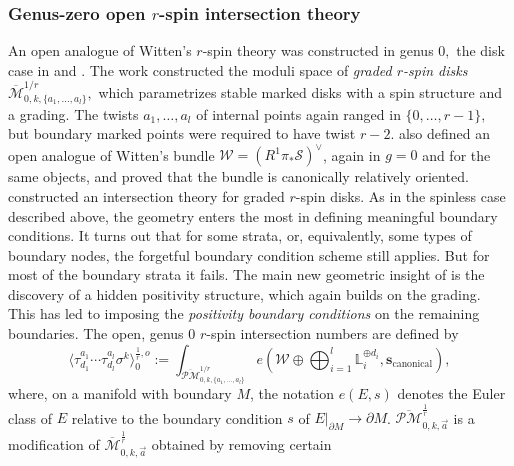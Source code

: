\documentclass[11pt]{amsart}
\theoremstyle{definition}
\theoremstyle{remark}
\newcommand{\Mbarr}{{{\overline{\mathcal{M}}}^{\frac{1}{r}}_{0,k,\vec{a}}}}
\newcommand{\oPM}{{\overline{\mathcal{PM}}}^{1/r}}
\newcommand{\oPMr}{{{\overline{\mathcal{PM}}}^{\frac{1}{r}}_{0,k,\vec{a}}}}
\newcommand{\<}{\left<}
\renewcommand{\>}{\right>}
\numberwithin{equation}{section}
\def\Mbar{{\overline{\mathcal M}}}
\begin{document}
\subsubsection{Genus-zero open $r$-spin intersection theory}
An open analogue of Witten's $r$-spin theory was constructed in genus $0,$ the disk case in \cite{BCT1,BCT2} and \cite{TZ1,TZ2}.
The work \cite{BCT1} constructed the moduli space of %
\emph{graded $r$-spin disks}~$\Mbar_{0,k,\{a_1, \ldots, a_l\}}^{1/r},$ which %
parametrizes stable marked disks with a spin structure and a grading. The twists $a_1,\ldots,a_l$ of internal points again ranged in $\{0,\ldots,r-1\},$ but boundary marked points were required to have twist $r-2.$ \cite{BCT1} also defined an open analogue of Witten's bundle $\mathcal{W}=(R^1\pi_*\mathcal{S})^{\vee}$, again in $g=0$ and for the same objects, and proved that the bundle is canonically relatively oriented.
\cite{BCT2} constructed an intersection theory for graded $r$-spin disks. As in the spinless case described above, the geometry enters the most in defining meaningful boundary conditions.
It turns out that for some strata, or, equivalently, some types of boundary nodes, the forgetful boundary condition scheme still applies. But for most of the boundary strata it fails. The main new geometric insight of \cite{BCT2} is the discovery of a hidden positivity structure, which again builds on the grading. This has led to imposing the \emph{positivity boundary conditions} on the remaining boundaries. 
The open, genus $0$ $r$-spin intersection numbers are defined by
\begin{equation}
\label{eq:intnums}
\langle\tau_{d_1}^{a_1}\cdots\tau^{a_l}_{d_l}\sigma^k\rangle^{\frac{1}{r},o}_0:=\int_{\oPM_{0,k,\{a_1, \ldots, a_l\}}} e\left( \mathcal{W} \oplus \bigoplus_{i=1}^l \mathbb{L}_i^{\oplus d_i}, \mathbf{s}_{\text{canonical}}\right),
\end{equation}
where, on a manifold with boundary $M$, the notation $e(E,s)$ denotes the Euler class of $E$ relative to the boundary condition $s$ of $E|_{\partial M}\to \partial M$. $\oPMr$ is a modification of $\Mbarr$ obtained by removing certain %
\end{document}
